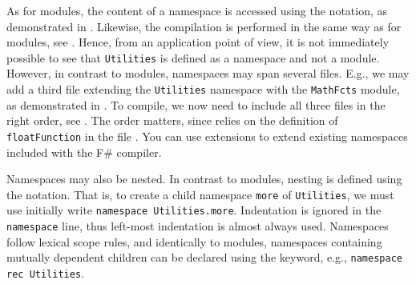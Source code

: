 As for modules, the content of a namespace is accessed using the  notation, as demonstrated in .
%
%
Likewise, the compilation is performed in the same way as for modules, see .
%
%
Hence, from an application point of view, it is not immediately possible to see that \lstinline{Utilities} is defined as a namespace and not a module.  However, in contrast to modules, namespaces may span several files. E.g., we may add a third file extending the \lstinline{Utilities} namespace with the \lstinline{MathFcts} module, as demonstrated in .
%
%
To compile, we now need to include all three files in the right order, see .
%
%
The order matters, since  relies on the definition of \lstinline{floatFunction} in the file . You can use extensions to extend existing namespaces included with the F\# compiler.

Namespaces may also be nested. In contrast to modules, nesting is defined using the  notation. That is, to create a child namespace \lstinline{more} of \lstinline{Utilities}, we must use initially write \mbox{\lstinline{namespace Utilities.more}}. Indentation is ignored in the \lstinline{namespace} line, thus left-most indentation is almost always used. Namespaces follow lexical scope rules, and identically to modules, namespaces containing mutually dependent children can be declared using the  keyword, e.g., \mbox{\lstinline{namespace rec Utilities}}.

